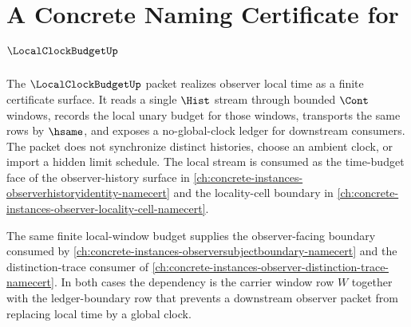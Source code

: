 \chapter{A Concrete Naming Certificate for $\LocalClockBudgetUp$}
\label{ch:concrete-instances-localclockbudget-namecert}

The $\LocalClockBudgetUp$ packet realizes observer local time as a finite certificate surface. It reads a single $\Hist$ stream through bounded $\Cont$ windows, records the local unary budget for those windows, transports the same rows by $\hsame$, and exposes a no-global-clock ledger for downstream consumers. The packet does not synchronize distinct histories, choose an ambient clock, or import a hidden limit schedule. The local stream is consumed as the time-budget face of the observer-history surface in \autoref{ch:concrete-instances-observerhistoryidentity-namecert} and the locality-cell boundary in \autoref{ch:concrete-instances-observer-locality-cell-namecert}.

The same finite local-window budget supplies the observer-facing boundary consumed by \autoref{ch:concrete-instances-observersubjectboundary-namecert} and the distinction-trace consumer of \autoref{ch:concrete-instances-observer-distinction-trace-namecert}. In both cases the dependency is the carrier window row $W$ together with the ledger-boundary row that prevents a downstream observer packet from replacing local time by a global clock.


